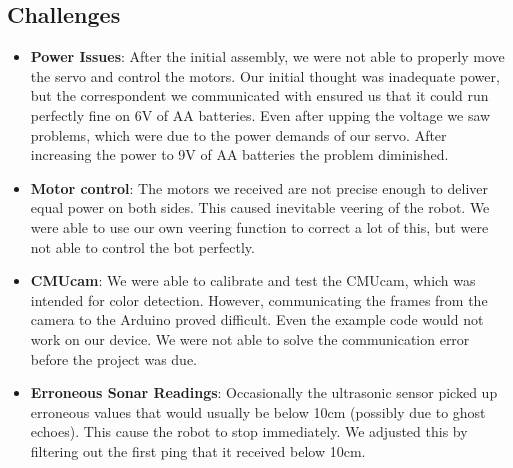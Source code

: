 \documentclass[11pt]{article}
\begin{document}
	\subsection{Challenges}
		
		\begin{itemize}				
		\item \textbf{Power Issues}: After the initial assembly, we were not able to properly move the servo and control the motors.  Our initial thought was inadequate power, but the correspondent we communicated with ensured us that it could run perfectly fine on 6V of AA batteries.  Even after upping the voltage we saw problems, which were due to the power demands of our servo.  After increasing the power to 9V of AA batteries the problem diminished.
		\item \textbf{Motor control}: The motors we received are not precise enough to deliver equal power on both sides.  This caused inevitable veering of the robot.  We were able to use our own veering function to correct a lot of this, but were not able to control the bot perfectly.
		\item \textbf{CMUcam}: We were able to calibrate and test the CMUcam, which was intended for color detection.  However, communicating the frames from the camera to the Arduino proved difficult.  Even the example code would not work on our device. We were not able to solve the communication error before the project was due.
		\item \textbf{Erroneous Sonar Readings}: Occasionally the ultrasonic sensor picked up erroneous values that would usually be below 10cm (possibly due to ghost echoes).  This cause the robot to stop immediately.  We adjusted this by filtering out the first ping that it received below 10cm.
		\end{itemize}
\end{document}
